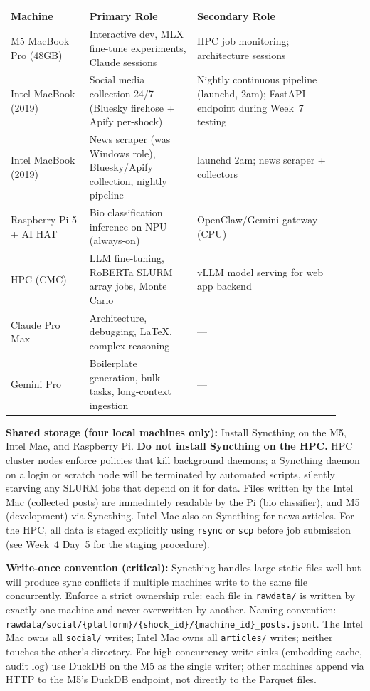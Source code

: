 \documentclass[11pt]{article}
\begin{document}
\begin{center}
\begin{tabular}{p{0.22\linewidth}p{0.30\linewidth}p{0.40\linewidth}}
\toprule
\textbf{Machine} & \textbf{Primary Role} & \textbf{Secondary Role} \\
\midrule
M5 MacBook Pro (48GB) & Interactive dev, MLX fine-tune experiments, Claude sessions & HPC job monitoring; architecture sessions \\
Intel MacBook (2019) & Social media collection 24/7 (Bluesky firehose + Apify per-shock) & Nightly continuous pipeline (launchd, 2am); FastAPI endpoint during Week~7 testing \\
Intel MacBook (2019) & News scraper (was Windows role), Bluesky/Apify collection, nightly pipeline & launchd 2am; news scraper + collectors \\
Raspberry Pi 5 + AI HAT & Bio classification inference on NPU (always-on) & OpenClaw/Gemini gateway (CPU) \\
HPC (CMC) & LLM fine-tuning, RoBERTa SLURM array jobs, Monte Carlo & vLLM model serving for web app backend \\
Claude Pro Max & Architecture, debugging, LaTeX, complex reasoning & --- \\
Gemini Pro & Boilerplate generation, bulk tasks, long-context ingestion & --- \\
\bottomrule
\end{tabular}
\end{center}

\medskip
\noindent\textbf{Shared storage (four local machines only):} Install Syncthing on
the M5, Intel Mac, and Raspberry Pi. \textbf{Do not install
Syncthing on the HPC.} HPC cluster nodes enforce policies that kill background
daemons; a Syncthing daemon on a login or scratch node will be terminated by
automated scripts, silently starving any SLURM jobs that depend on it for data.
Files written by the Intel Mac (collected posts) are immediately readable by the
Pi (bio classifier), and M5 (development) via Syncthing. Intel Mac also on Syncthing for news articles.
For the HPC, all data is staged explicitly using \texttt{rsync} or \texttt{scp}
before job submission (see Week~4 Day~5 for the staging procedure).

\medskip
\noindent\textbf{Write-once convention (critical):} Syncthing handles large static
files well but will produce sync conflicts if multiple machines write to the same
file concurrently. Enforce a strict ownership rule: each file in \texttt{rawdata/}
is written by exactly one machine and never overwritten by another. Naming convention:
\texttt{rawdata/social/\{platform\}/\{shock\_id\}/\{machine\_id\}\_posts.jsonl}. The Intel Mac
owns all \texttt{social/} writes; Intel Mac owns all \texttt{articles/} writes; neither
touches the other's directory. For high-concurrency write sinks (embedding cache,
audit log) use DuckDB on the M5 as the single writer; other machines append via HTTP
to the M5's DuckDB endpoint, not directly to the Parquet files.
\end{document}
